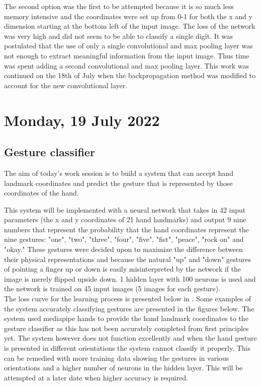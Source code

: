 The second option was the first to be attempted because it is so much less memory intensive and the coordinates were set up from 0-1 for both the x and y dimension starting at the bottom left of the input image. The loss of the network was very high and did not seem to be able to classify a single digit. It was postulated that the use of only a single convolutional and max pooling layer was not enough to extract meaningful information from the input image. Thus time was spent adding a second convolutional and max pooling layer. This work was continued on the 18th of July when the backpropagation method was modified to account for the new convolutional layer.

\section[2022/07/19]{Monday, 19 July 2022}

\subsection{Gesture classifier}

The aim of today's work session is to build a system that can accept hand landmark coordinates and predict the gesture that is represented by those coordinates of the hand.

This system will be implemented with a neural network that takes in 42 input parameters (the x and y coordinates of 21 hand landmarks) and output 9 nine numbers that represent the probability that the hand coordinates represent the nine gestures: "one", "two", "three", "four", "five", "fist", "peace", "rock on" and "okay." These gestures were decided upon to maximize the difference between their physical representations and because the natural "up" and "down" gestures of pointing a finger up or down is easily misinterpreted by the network if the image is merely flipped upside down. 1 hidden layer with 100 neurons is used and the network is trained on 45 input images (5 images for each gesture). \\

The loss curve for the learning process is presented below in . Some examples of the system accurately classifying gestures are presented in the figures below. The system used mediapipe hands to provide the hand landmark coordinates to the gesture classifier as this has not been accurately completed from first principles yet. The system however does not function excellently and when the hand gesture is presented in different orientations the system cannot classify it properly. This can be remedied with more training data showing the gestures in various orientations and a higher number of neurons in the hidden layer. This will be attempted at a later date when higher accuracy is required.


